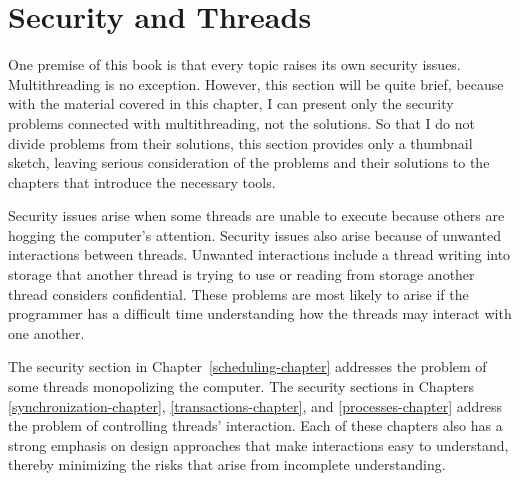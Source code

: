 \section{Security and Threads}

One premise of this book is that every topic raises its own security
issues.  Multithreading is no exception.  However, this section will
be quite brief, because with the material covered in this chapter, I can present only the
security problems connected with multithreading, not the
solutions.  So that I do not divide problems from their solutions, this
section provides only a thumbnail sketch, leaving serious
consideration of the problems and their solutions to the chapters that
introduce the necessary tools.

Security issues arise
when some threads are unable to execute because others are hogging the
computer's attention.  Security issues also arise because of unwanted
interactions between threads. Unwanted interactions include a thread writing into storage
that another thread is trying to use or reading from storage another
thread considers confidential.  These problems are most
likely to arise if the programmer has a difficult time understanding
how the threads may interact with one another.

The security section in Chapter~\ref{scheduling-chapter} addresses the
problem of some threads monopolizing the computer.  The security
sections in Chapters \ref{synchronization-chapter},
\ref{transactions-chapter}, and \ref{processes-chapter} address the
problem of controlling threads' interaction.  Each of these chapters
also has a strong emphasis on design approaches that make interactions
easy to understand, thereby minimizing the risks that arise from
incomplete understanding.

